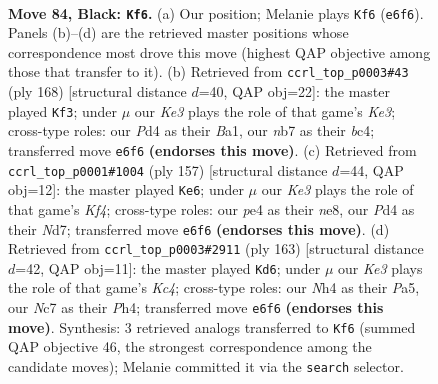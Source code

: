 \documentclass[11pt]{article}
\begin{document}
\clearpage

\begin{figure}[p]\centering
\begin{subfigure}{0.46\textwidth}\centering
\resizebox{\linewidth}{!}{%
\newchessgame
\chessboard[
  setfen={8/1Nn5/4k3/p7/Pb1pP2n/1P1B3p/1K2P3/8 b - - 35 84},
  showmover=false,
  pgfstyle=straightmove, color=movearrow, markmove={e6-f6}
]}
\caption{}
\end{subfigure}\hfill
\begin{subfigure}{0.46\textwidth}\centering
\resizebox{\linewidth}{!}{%
\newchessgame
\chessboard[
  setfen={6k1/1B3p2/Pb4p1/2p1P2p/2b4P/4K1P1/8/B7 w - - 45 85},
  showmover=false,
  pgfstyle=straightmove, color=movearrow, markmove={e3-f3}
]}
\caption{}
\end{subfigure}
\\[4pt]
\begin{subfigure}{0.46\textwidth}\centering
\resizebox{\linewidth}{!}{%
\newchessgame
\chessboard[
  setfen={4N3/3n4/p5p1/1p1n1k2/P2B4/1P3K2/5P2/8 b - - 0 79},
  showmover=false,
  pgfstyle=straightmove, color=movearrow, markmove={f5-e6}
]}
\caption{}
\end{subfigure}\hfill
\begin{subfigure}{0.46\textwidth}\centering
\resizebox{\linewidth}{!}{%
\newchessgame
\chessboard[
  setfen={8/8/8/p1kPp1p1/7p/1B2PP1P/P3K3/2b5 b - - 81 82},
  showmover=false,
  pgfstyle=straightmove, color=movearrow, markmove={c5-d6}
]}
\caption{}
\end{subfigure}
\caption{\textbf{Move 84, Black: \texttt{Kf6}.} (a) Our position; Melanie plays \texttt{Kf6} (\texttt{e6f6}). Panels (b)--(d) are the retrieved master positions whose correspondence most drove this move (highest QAP objective among those that transfer to it). (b) Retrieved from \texttt{ccrl\_top\_p0003\#43} (ply 168) [structural distance $d$=40, QAP obj=22]: the master played \texttt{Kf3}; under $\mu$ our \emph{Ke3} plays the role of that game's \emph{Ke3}; cross-type roles: our \emph{P}d4 as their \emph{B}a1, our \emph{n}b7 as their \emph{b}c4; transferred move \texttt{e6f6} \textbf{(endorses this move)}. (c) Retrieved from \texttt{ccrl\_top\_p0001\#1004} (ply 157) [structural distance $d$=44, QAP obj=12]: the master played \texttt{Ke6}; under $\mu$ our \emph{Ke3} plays the role of that game's \emph{Kf4}; cross-type roles: our \emph{p}e4 as their \emph{n}e8, our \emph{P}d4 as their \emph{N}d7; transferred move \texttt{e6f6} \textbf{(endorses this move)}. (d) Retrieved from \texttt{ccrl\_top\_p0003\#2911} (ply 163) [structural distance $d$=42, QAP obj=11]: the master played \texttt{Kd6}; under $\mu$ our \emph{Ke3} plays the role of that game's \emph{Kc4}; cross-type roles: our \emph{N}h4 as their \emph{P}a5, our \emph{N}c7 as their \emph{P}h4; transferred move \texttt{e6f6} \textbf{(endorses this move)}. Synthesis: 3 retrieved analogs transferred to \texttt{Kf6} (summed QAP objective 46, the strongest correspondence among the candidate moves); Melanie committed it via the \texttt{search} selector.}
\label{fig:thought-m167}
\end{figure}
\end{document}
